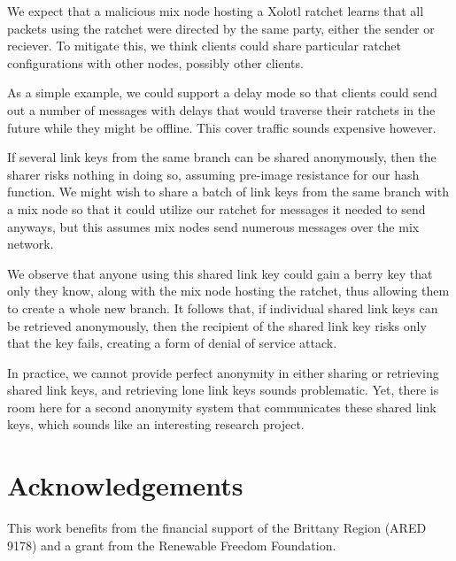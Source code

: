 \documentclass[twoside,letterpaper]{llncs}
\begin{document}
We expect that a malicious mix node hosting a Xolotl ratchet learns
that all packets using the ratchet were directed by the same party,
either the sender or reciever.  To mitigate this, we think clients
could share particular ratchet configurations with other nodes,
possibly other clients.  

As a simple example, we could support a delay mode so that clients
could send out a number of messages with delays that would traverse
their ratchets in the future while they might be offline. 
This cover traffic sounds expensive however.

If several link keys from the same branch can be shared anonymously,
then the sharer risks nothing in doing so, assuming pre-image
resistance for our hash function.  We might wish to share a batch
of link keys from the same branch with a mix node so that it could
utilize our ratchet for messages it needed to send anyways, but this
assumes mix nodes send numerous messages  over the mix network.

We observe that anyone using this shared link key could gain a berry
key that only they know, along with the mix node hosting the ratchet,
thus allowing them to create a whole new branch.  It follows that,
if individual shared link keys can be retrieved anonymously, then
the recipient of the shared link key risks only that the key fails,
creating a form of denial of service attack.

In practice, we cannot provide perfect anonymity in either sharing
or retrieving shared link keys, and retrieving lone link keys sounds
problematic.  Yet, there is room here for a second anonymity system
that communicates these shared link keys, which sounds like an
interesting research project.


\section*{Acknowledgements}
This work benefits from the financial support of the Brittany Region
(ARED 9178) and a grant from the Renewable Freedom Foundation.





\end{document}
